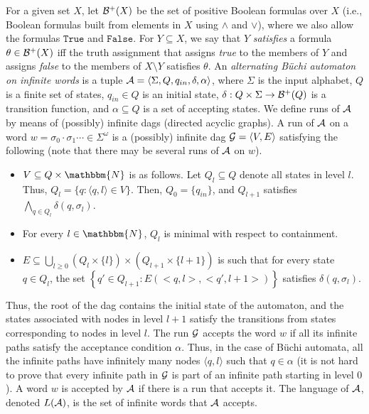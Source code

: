 \documentclass{llncs}
\newcommand{\set}[1]{{\left\{#1\right\}}}
\newcommand{\Nat}{\mathbbm{N}}
\newcommand{\tuple}[1]{\langle #1  \rangle}
\newcommand{\zug}[1]{\langle #1  \rangle}
\newcommand{\pair}{\tuple}
\newcommand{\True}{\mathtt{True}}
\newcommand{\False}{\mathtt{False}}
\newcommand{\A}{{\cal A}}
\begin{document}
For a given set $X$, let ${\cal B}^{+}(X)$ be the set of positive Boolean formulas over $X$ (i.e., Boolean formulas built from elements in $X$
using $\wedge$ and $\vee$), where we also allow the formulas $\True$ and $\False$. For $Y \subseteq X$, we say that $Y$ {\em satisfies\/} a
formula $\theta \in {\cal B}^+(X)$ iff the truth assignment that assigns {\em true} to the members of $Y$ and assigns {\em false} to the
members of $X \setminus Y$ satisfies $\theta$.
An {\em alternating B\"uchi automaton on infinite words\/} is a tuple
$\A=\tuple{\Sigma, Q, q_{in}, \delta, \alpha}$, where $\Sigma$
is the input alphabet, $Q$ is a finite set of states, $q_{in} \in Q$ is an initial state, $\delta : Q \times \Sigma \rightarrow {\cal B}^+(Q) $
is a transition function, and $\alpha \subseteq Q$ is a set of accepting states. We define runs of $\A$ by means of (possibly) infinite {\sc dag}s
(directed acyclic graphs).  A run of $\A$ on a word
$w=\sigma_0 \cdot \sigma_1 \cdots \in \Sigma^\omega$ is a (possibly) infinite {\sc dag}  ${\cal G}=\pair{V,E}$ satisfying the following (note that there may be several runs
of $\A$ on $w$).
\begin{itemize}
\item
$V \subseteq Q \times \Nat$ is as follows. Let $Q_l \subseteq Q$ denote
 all states
 in level $l$. Thus, $Q_l=\{q: \pair{q,l} \in V\}$. Then,
$Q_0=\{q_{in}\}$, and $Q_{l+1}$ satisfies $\bigwedge_{q \in Q_l}
 \delta(q,\sigma_l)$.
\item For every $l\in \Nat$, $Q_l$ is minimal with respect to containment.
\item
$E \subseteq \bigcup_{l \geq 0} (Q_l \times \{l\}) \times (Q_{l+1} \times \{l+1\})$ is such that for every state $q\in Q_l$, the set $\set{q'\in Q_{l+1}: E(<q,l>,<q',l+1>)}$ satisfies $\delta(q,\sigma_l)$.
\end{itemize}
Thus, the root of the {\sc dag} contains the initial state of the automaton, and the states associated with nodes in level $l+1$ satisfy the
transitions from states corresponding to nodes in level $l$.
The run ${\cal G}$ accepts the word $w$ if all its infinite paths satisfy the acceptance condition $\alpha$. Thus, in the case of B\"uchi automata,
all the infinite paths have infinitely many nodes $\zug{q,l}$ such that $q\in \alpha$
(it is not hard to prove that every infinite path in ${\cal G}$ is part of an infinite path starting in level $0$).
A word $w$ is accepted by $\A$ if there is a run that accepts it. The language of ${\cal A}$,
denoted $L({\cal A})$, is the set of infinite words that ${\cal A}$ accepts.
\end{document}

